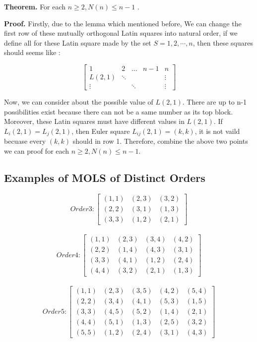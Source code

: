 \documentclass[12pt]{article}
\begin{document}
\textbf{Theorem.} For each $n \ge 2, N(n) \le n - 1$ .

\textbf{Proof.} Firstly, due to the lemma which mentioned before, We can change the first row of these mutually orthogonal Latin squares into natural order, if we define all for these Latin square made by the set $S = {1, 2,\cdots,n}$, then these squares should seems like :

\[ \begin{bmatrix}
1 & 2 & \dots & n-1 & n \\
L(2,1) & \ddots &  &  & \vdots \\
\vdots &  & \ddots &  & \vdots \end{bmatrix} \]

Now, we can consider about the possible value of $L(2,1)$. There are up to n-1 possibilities exist because there can not be a same number as its top block. Moreover, these Latin squares must have different values in $L(2,1)$. If $L_i(2,1) = L_j(2,1)$, then Euler square $L_{ij}(2,1)=(k,k)$, it is not vaild becuase every $(k,k)$ should in row 1.
Therefore, combine the above two points we can proof for each $n \ge 2, N(n) \le n - 1$.

\subsection{Examples of MOLS of Distinct Orders}

\[Order 3:\begin{bmatrix}(1,1) & (2,3) & (3,2)\\
                         (2,2) & (3,1) & (1,3)\\
                         (3,3) & (1,2) & (2,1) \end{bmatrix} \]\\

\[Order 4:\begin{bmatrix}(1,1) & (2,3) & (3,4) & (4,2)\\
                         (2,2) & (1,4) & (4,3) & (3,1)\\
                         (3,3) & (4,1) & (1,2) & (2,4)\\
                         (4,4) & (3,2) & (2,1) & (1,3) \end{bmatrix} \]\\

\[Order 5:\begin{bmatrix}(1,1) & (2,3) & (3,5) & (4,2) & (5,4)\\
                         (2,2) & (3,4) & (4,1) & (5,3) & (1,5)\\
                         (3,3) & (4,5) & (5,2) & (1,4) & (2,1)\\
                         (4,4) & (5,1) & (1,3) & (2,5) & (3,2)\\
                         (5,5) & (1,2) & (2,4) & (3,1) & (4,3) \end{bmatrix} \]\\
\end{document}
